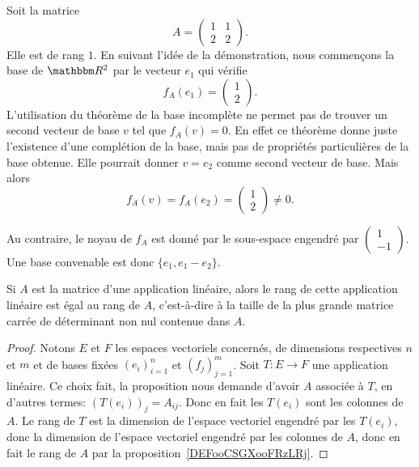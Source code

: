 \begin{example}     \label{EXooRKVQooZOGDEf}
    Soit la matrice 
    \begin{equation}
        A=\begin{pmatrix}
            1    &   1    \\ 
            2    &   2    
        \end{pmatrix}.
    \end{equation}
    Elle est de rang \( 1\). En suivant l'idée de la démonstration, nous commençons la base de \( \eR^2\) par le vecteur \( e_1\) qui vérifie
    \begin{equation}
        f_A(e_1)=\begin{pmatrix}
            1    \\ 
            2    
        \end{pmatrix}.
    \end{equation}
    L'utilisation du théorème de la base incomplète ne permet pas de trouver un second vecteur de base \( v\) tel que \( f_A(v)=0\). En effet ce théorème donne juste l'existence d'une complétion de la base, mais pas de propriétés particulières de la base obtenue. Elle pourrait donner \( v=e_2\) comme second vecteur de base. Mais alors
    \begin{equation}
        f_A(v)=f_A(e_2)=\begin{pmatrix}
            1    \\ 
            2    
        \end{pmatrix}\neq 0.
    \end{equation}

    Au contraire, le noyau de \( f_A\) est donné par le sous-espace engendré par \( \begin{pmatrix}
        1    \\ 
        -1    
    \end{pmatrix}\). Une base convenable est donc \( \{ e_1, e_1-e_2 \}\).
\end{example}


\begin{proposition} \label{PropEJBZooTNFPRj}
    Si \( A\) est la matrice d'une application linéaire, alors le rang de cette application linéaire est égal au rang de \( A \), c'est-à-dire à la taille de la plus grande matrice carrée de déterminant non nul contenue dans \( A\).
\end{proposition}

\begin{proof}
  Notons \( E \) et \( F \) les espaces vectoriels concernés, de dimensions respectives \( n \) et \( m \) et de bases fixées \( (e_i)_{i=1}^n \) et \( (f_j)_{j=1}^m \). Soit \( T: E \to F \) une application linéaire. Ce choix fait, la proposition nous demande d'avoir \( A \)  associée à \( T \), en d'autres termes: \( (T(e_i))_j = A_{ij} \). Donc en fait les \( T(e_i) \) sont les colonnes de \( A \). Le rang de \( T \) est la dimension de l'espace vectoriel engendré par les \( T(e_i) \), donc la dimension de l'espace vectoriel engendré par les colonnes de \( A \), donc en fait le rang de \( A \) par la proposition~\ref{DEFooCSGXooFRzLRj}.
\end{proof}


